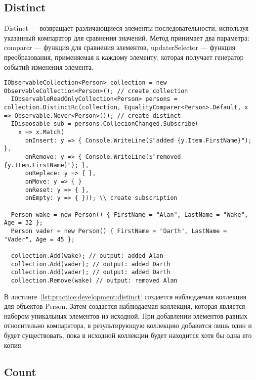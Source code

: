 \subsection{Distinct}
\label{sub:development:distinct}

Distinct --- возвращает различающиеся элементы последовательности, используя указанный компаратор для сравнения значений.
Метод принимает два параметра: comparer --- функция для сравнения элементов, updaterSelector --- функция преобразования, применяемая к каждому элементу, которая получает генератор событий изменения элемента.

\begin{lstlisting}[style=csharpinlinestyle, caption={Пример использования Distinct}, label=lst:practice:development:distinct]
  IObservableCollection<Person> collection = new ObservableCollection<Person>(); // create collection
  IObservableReadOnlyCollection<Person> persons = collection.DistinctRc(collection, EqualityComparer<Person>.Default, x => Observable.Never<Person>()); // create distinct
  IDisposable sub = persons.CollecionChanged.Subscribe(
    x => x.Match(
      onInsert: y => { Console.WriteLine($"added {y.Item.FirstName}"); },
      onRemove: y => { Console.WriteLine($"removed {y.Item.FirstName}"); },
      onReplace: y => { },
      onMove: y => { }
      onReset: y => { },
      onEmpty: y => { })); \\ create subscription

  Person wake = new Person() { FirstName = "Alan", LastName = "Wake", Age = 32 };
  Person vader = new Person() { FirstName = "Darth", LastName = "Vader", Age = 45 };

  collection.Add(wake); // output: added Alan
  collection.Add(vader); // output: added Darth
  collection.Add(vader); // output: added Darth
  collection.Remove(wake) // output: removed Alan

\end{lstlisting}

В листинге~\ref{lst:practice:development:distinct} создается наблюдаемая коллекция для объектов Person. Затем создается наблюдаемая коллекция, которая является набором уникальных элементов из исходной.
При добавлении элементов равных относительно компаратора, в результирующую коллекцию добавится лишь один и будет существовать, пока в исходной коллекции будет находится хотя бы одна его копия.

\subsection{Count}
\label{sub:development:count}

